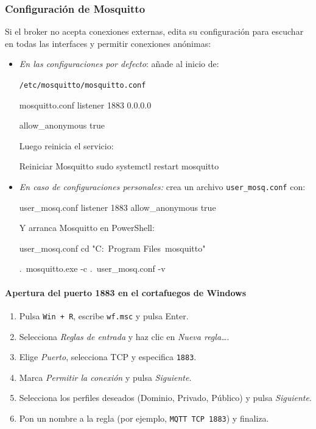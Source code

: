 \documentclass[12pt, a4paper]{article}
\begin{document}
\begin{umaappendices}
	\subsubsection{Configuración de Mosquitto}
	Si el broker no acepta conexiones externas, edita su configuración para escuchar en todas las interfaces y permitir conexiones anónimas:
	
	\begin{itemize}
		\item  \textit{En las configuraciones por defecto}: añade al inicio de:
		
		\texttt{/etc/mosquitto/}\texttt{mosquitto.conf}
		\begin{Terminal}{mosquitto.conf}
			listener 1883 0.0.0.0 
			
			allow\_anonymous true
		\end{Terminal}
		Luego reinicia el servicio:
		\begin{Terminal}{Reiniciar Mosquitto}
			sudo systemctl restart mosquitto
		\end{Terminal}
		
		\item \textit{En caso de configuraciones personales:} crea un archivo \texttt{user\_mosq.conf} con:
		\begin{Terminal}{user\_mosq.conf}
			listener 1883  
			allow\_anonymous true
		\end{Terminal}
		Y arranca Mosquitto en PowerShell:
		\begin{Terminal}{user\_mosq.conf}
			cd "C:\ Program Files\ mosquitto"  
			
			.\ mosquitto.exe -c .\ user\_mosq.conf -v
		\end{Terminal}
	\end{itemize}
	
	\paragraph{Apertura del puerto 1883 en el cortafuegos de Windows}
	\begin{enumerate}
		\item Pulsa \texttt{Win + R}, escribe \texttt{wf.msc} y pulsa Enter.
		\item Selecciona \textit{Reglas de entrada} y haz clic en \textit{Nueva regla…}.
		\item Elige \textit{Puerto}, selecciona TCP y especifica \texttt{1883}.
		\item Marca \textit{Permitir la conexión} y pulsa \textit{Siguiente}.
		\item Selecciona los perfiles deseados (Dominio, Privado, Público) y pulsa \textit{Siguiente}.
		\item Pon un nombre a la regla (por ejemplo, \texttt{MQTT TCP 1883}) y finaliza.
	\end{enumerate}
	

\end{umaappendices}
\end{document}

